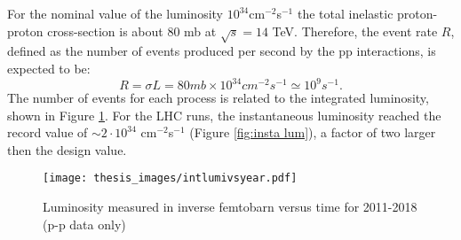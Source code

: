 \documentclass[a4paper, oneside, 11pt, openright]{book}
\begin{document}
				For the nominal value of the luminosity $10^{34}$cm$^{-2}$s$^{-1}$ the total inelastic proton-proton cross-section is about 80 mb at $\sqrt{s} = 14$ TeV. Therefore, the event rate $R$, defined as the number of events produced per second by the pp interactions, is expected to be:
				$$
				R = \sigma L = 80 mb\times10^{34}cm^{-2}s^{-1} \simeq 10^{9}s^{-1}.
				$$ 
				The number of events for each process is related to the integrated luminosity, shown in Figure \ref{fig:Integreted Luminosity}. For the LHC runs, the instantaneous luminosity reached the record value of $\sim 2 \cdot 10^{34}$ cm$^{-2}$s$^{-1}$ (Figure \ref{fig:insta lum}), a factor of two larger then the design value.
				
				\begin{figure}
					\centering
					\texttt{[image: thesis\_images/intlumivsyear.pdf]}
					\caption{Luminosity measured in inverse femtobarn versus time for 2011-2018 (p-p data only)}
					\label{fig:Integreted Luminosity}
				\end{figure}
				
\end{document}

